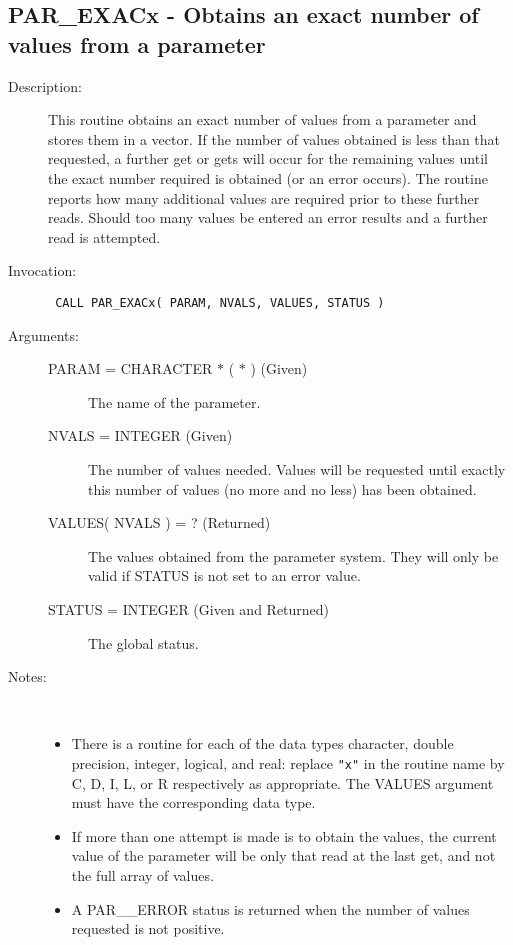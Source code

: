 \documentclass[twoside,11pt]{article}
\newcommand{\xlabel}[1]{}
\newlength{\sstbannerlength}
\newlength{\sstcaptionlength}
\newlength{\sstexampleslength}
\newlength{\sstexampleswidth}
\newcommand{\sstroutine}[3]{
   \goodbreak
   \rule{\textwidth}{0.5mm}
   \vspace{-7ex}
   \newline
   \settowidth{\sstbannerlength}{{\Large {\bf #1}}}
   \setlength{\sstcaptionlength}{\textwidth}
   \setlength{\sstexampleslength}{\textwidth}
   \addtolength{\sstbannerlength}{0.5em}
   \addtolength{\sstcaptionlength}{-2.0\sstbannerlength}
   \addtolength{\sstcaptionlength}{-5.0pt}
   \settowidth{\sstexampleswidth}{{\bf Examples:}}
   \addtolength{\sstexampleslength}{-\sstexampleswidth}
   \parbox[t]{\sstbannerlength}{\flushleft{\Large {\bf #1}}}
   \parbox[t]{\sstcaptionlength}{\center{\Large #2}}
   \parbox[t]{\sstbannerlength}{\flushright{\Large {\bf #1}}}
   \begin{description}
      #3
   \end{description}
}
\newcommand{\sstdescription}[1]{\item[Description:] #1}
\newcommand{\sstinvocation}[1]{\item[Invocation:]\hspace{0.4em}{\tt #1}}
\newcommand{\sstarguments}[1]{
   \item[Arguments:] \mbox{} \\
   \vspace{-3.5ex}
   \begin{description}
      #1
   \end{description}
}
\newcommand{\sstsubsection}[1]{ \item[{#1}] \mbox{} \\}
\newcommand{\sstnotes}[1]{\item[Notes:] \mbox{} \\[1.3ex] #1}
\newcommand{\sstitemlist}[1]{
  \mbox{} \\
  \vspace{-7ex}
  \begin{itemize}
     #1
  \end{itemize}
}
\newcommand{\sstitem}{\item}
\newcommand{\ssttt}{\tt}
\renewcommand{\sstroutine}[3]{
      \subsection{\xlabel{12}#1\xlabel{#1}-\label{#1}#2}
      \begin{description}
         #3
      \end{description}
   }
\renewcommand{\sstdescription}[1]{\item[Description:]
      \begin{description}
         #1
      \end{description}
   }
\renewcommand{\sstinvocation}[1]{\item[Invocation:]
      \begin{description}
         {\ssttt #1}
      \end{description}
   }
\renewcommand{\sstarguments}[1]{
      \item[Arguments:]
      \begin{description}
         #1
      \end{description}
   }
\renewcommand{\sstsubsection}[1]{\item[{#1}]}
\renewcommand{\sstnotes}[1]{\item[Notes:]
      \begin{description}
         #1
      \end{description}
   }
\newcommand{\sstitemlist}[1]{
      \begin{itemize}
         #1
      \end{itemize}
   }
\begin{document}
\sstroutine{
   PAR\_EXACx
}{
   Obtains an exact number of values from a parameter
}{
   \sstdescription{
      This routine obtains an exact number of values from a parameter
      and stores them in a vector.  If the number of values obtained
      is less than that requested, a further get or gets will occur
      for the remaining values until the exact number required is
      obtained (or an error occurs).  The routine reports how many
      additional values are required prior to these further reads.
      Should too many values be entered an error results and a further
      read is attempted.
   }
   \sstinvocation{
      CALL PAR\_EXACx( PARAM, NVALS, VALUES, STATUS )
   }
   \sstarguments{
      \sstsubsection{
         PARAM = CHARACTER $*$ ( $*$ ) (Given)
      }{
         The name of the parameter.
      }
      \sstsubsection{
         NVALS = INTEGER (Given)
      }{
         The number of values needed.  Values will be requested until
         exactly this number of values (no more and no less) has been
         obtained.
      }
      \sstsubsection{
         VALUES( NVALS ) = ? (Returned)
      }{
         The values obtained from the parameter system.  They will only
         be valid if STATUS is not set to an error value.
      }
      \sstsubsection{
         STATUS = INTEGER (Given and Returned)
      }{
         The global status.
      }
   }
   \sstnotes{
      \sstitemlist{

         \sstitem
         There is a routine for each of the data types character,
         double precision, integer, logical, and real: replace {\tt "x"} in the
         routine name by C, D, I, L, or R respectively as appropriate.  The
         VALUES argument must have the corresponding data type.

         \sstitem
         If more than one attempt is made is to obtain the values, the
         current value of the parameter will be only that read at the
         last get, and not the full array of values.

         \sstitem
         A PAR\_\_ERROR status is returned when the number of values
         requested is not positive.
      }
   }
}
\end{document}

